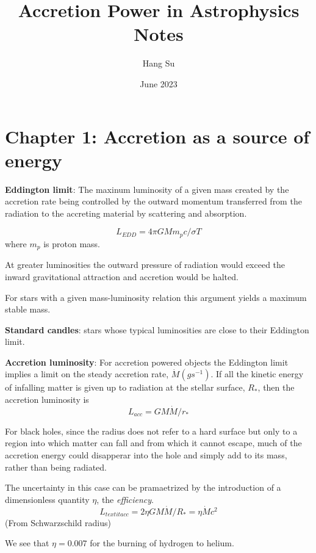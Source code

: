 \documentclass{article}
\title{Accretion Power in Astrophysics Notes}
\author{Hang Su}
\date{June 2023}
\begin{document}
\maketitle

\section{Chapter 1: Accretion as a source of energy}

\textbf{Eddington limit}: The maxinum luminosity of a given mass created by the accretion rate
being controlled by the outward momentum transferred from the radiation to the accreting material
by scattering and absorption.

\begin{equation}
    L_{\textit{EDD}} = 4 \pi G M m_p c / \sigma T
\end{equation}
where $m_p$ is proton mass. 

At greater luminosities the outward pressure of radiation would exceed the inward gravitational attraction and accretion
would be halted.

For stars with a given mass-luminosity relation this argument yields a maximum stable mass. 

\textbf{Standard candles}: stars whose typical luminosities are close to their Eddington limit.

\textbf{Accretion luminosity}: For accretion powered objects the Eddington limit implies a limit on the steady
accretion rate, $\dot{M} (g s^{-1})$. If all the kinetic energy of infalling matter is given up to radiation at the 
stellar surface, $R_\ast$, then the accretion luminosity is
\begin{equation}
    L_{\textit{acc}} =  GM\dot{M}/ r_\ast
\end{equation}

For black holes, since the radius does not refer to a hard surface but only to a region into which
matter can fall and from which it cannot escape, much of the accretion energy could disapperar into 
the hole and simply add to its mass, rather than being radiated.

The uncertainty in this case can be pramaetrized by the introduction of a dimensionless quantity $\eta$,
the \emph{efficiency}.
\begin{equation}
    L_{textit{acc}} = 2 \eta GM\dot{M} / R_\ast = \eta \dot{M} c^2
\end{equation}
(From Schwarzschild radius)

We see that $\eta = 0.007$ for the burning of hydrogen to helium.
\end{document}
